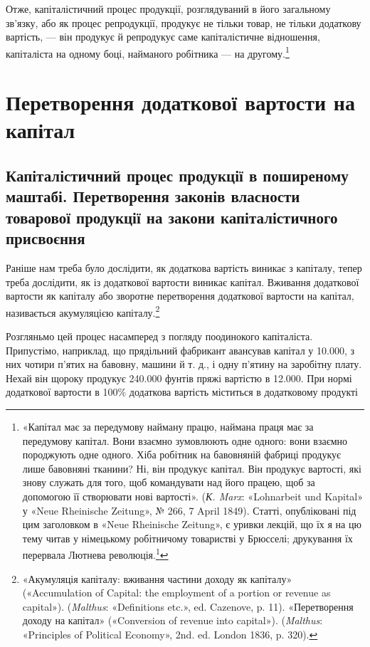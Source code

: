 Отже, капіталістичний процес продукції, розглядуваний в
його загальному зв’язку, або як процес репродукції, продукує
не тільки товар, не тільки додаткову вартість, — він продукує
й репродукує саме капіталістичне відношення, капіталіста на
одному боці, найманого робітника — на другому.\footnote{
«Капітал має за передумову найману працю, наймана праця має за передумову
капітал. Вони взаємно зумовлюють одне одного: вони взаємно породжують одне
одного. Хіба робітник на бавовняній фабриці
продукує лише бавовняні тканини? Ні, він продукує капітал. Він продукує
вартості, які знову служать для того, щоб командувати над його працею, щоб за
допомогою її створювати нові вартості». (\emph{К. Marx}:
«Lohnarbeit und Kapital» у «Neue Rheinische Zeitung», № 266, 7 April 1849).
Статті, опубліковані під цим заголовком в «Neue Rheinische Zeitung», є уривки
лекцій, що їх я на цю тему читав у німецькому
робітничому товаристві у Брюсселі; друкування їх перервала Лютнева
революція.\footnote*{
Статті ці з’явилися потім окремою брошурою і під тією ж назвою.
Є українське видання: Партвидав «Пролетар» 1932 р. \emph{Ред.}
}
}

\section{Перетворення додаткової вартости на капітал}

\subsection{Капіталістичний процес продукції в поширеному маштабі.
Перетворення законів власности товарової продукції на закони
капіталістичного присвоєння}

Раніше нам треба було дослідити, як додаткова вартість виникає
з капіталу, тепер треба дослідити, як із додаткової вартости
виникає капітал. Вживання додаткової вартости як капіталу
або зворотне перетворення додаткової вартости на капітал, називається
акумуляцією капіталу.\footnote{
«Акумуляція капіталу: вживання частини доходу як капіталу» («Accumulation of
Capital: the employment of a portion or revenue as capital»). (\emph{Malthus}:
«Definitions etc.», ed. Cazenove, p. 11).
«Перетворення доходу на капітал» («Conversion of revenue into capital»).
(\emph{Malthus}: «Principles of Political Economy», 2nd. ed. London 1836, p. 320).
}

Розгляньмо цей процес насамперед з погляду поодинокого капіталіста. Припустімо,
наприклад, що прядільний фабрикант авансував капітал у \num{10.000},
з них чотири п’ятих на бавовну, машини й т. д., і одну п’ятину на заробітну
плату. Нехай він щороку продукує \num{240.000} фунтів пряжі
вартістю в \num{12.000}. При нормі додаткової вартости в 100\%
додаткова вартість міститься в додатковому продукті
\parbreak{}  %

